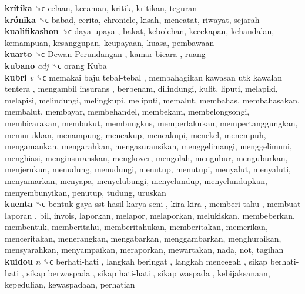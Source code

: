 \textbf{krítika} ␝ϲ  celaan, kecaman, kritik, kritikan, teguran  \\
\textbf{krónika} ␝ϲ  babad, cerita, chronicle, kisah, mencatat, riwayat, sejarah  \\
\textbf{kualifikashon} ␝ϲ   daya upaya , bakat, kebolehan, kecekapan, kehandalan, kemampuan, kesanggupan, keupayaan, kuasa, pembawaan  \\
\textbf{kuarto} ␝ϲ   Dewan Perundangan ,  kamar bicara , ruang  \\
\textbf{kubano} \emph{adj}  ␝ϲ   orang Kuba   \\
\textbf{kubri} \emph{v}  ␝ϲ   memakai baju tebal-tebal ,  membahagikan kawasan utk kawalan tentera ,  mengambil insurans , berbenam, dilindungi, kulit, liputi, melapiki, melapisi, melindungi, melingkupi, meliputi, memalut, membahas, membahasakan, membalut, membayar, membehandel, membekam, membelongsongi, membicarakan, membukut, membungkus, memperlakukan, mempertanggungkan, memurukkan, menampung, mencakup, mencakupi, menekel, menempuh, mengamankan, mengarahkan, mengasuransikan, menggelimangi, menggelimuni, menghiasi, menginsuranskan, mengkover, mengolah, mengubur, menguburkan, menjerukun, menudung, menudungi, menutup, menutupi, menyalut, menyaluti, menyamarkan, menyapa, menyelubungi, menyelundup, menyelundupkan, menyembunyikan, penutup, tudung, uruskan  \\
\textbf{kuenta} ␝ϲ   bentuk gaya sst hasil karya seni ,  kira-kira ,  memberi tahu ,  membuat laporan , bil, invois, laporkan, melapor, melaporkan, melukiskan, membeberkan, membentuk, memberitahu, memberitahukan, memberitakan, memerikan, menceritakan, menerangkan, mengabarkan, menggambarkan, menghuraikan, mensyarahkan, menyampaikan, meraporkan, mewartakan, nada, not, tagihan  \\
\textbf{kuidou} \emph{n}  ␝ϲ   berhati-hati ,  langkah beringat ,  langkah mencegah ,  sikap berhati-hati ,  sikap berwaspada ,  sikap hati-hati ,  sikap waspada , kebijaksanaan, kepedulian, kewaspadaan, perhatian  \\

